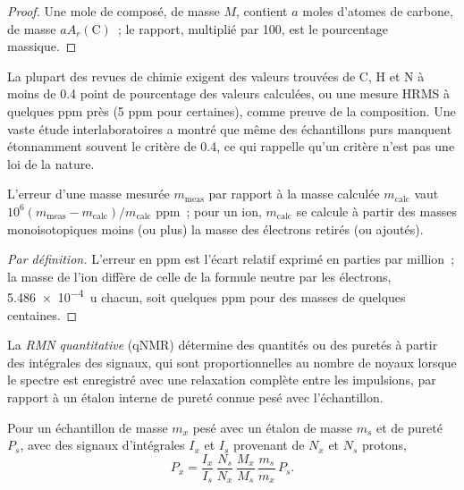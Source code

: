 \begin{proof}
Une mole de composé, de masse $M$, contient $a$ moles d'atomes de carbone, de masse $aA_r(\mathrm C)$~;
le rapport, multiplié par 100, est le pourcentage massique.
\end{proof}

La plupart des revues de chimie exigent des valeurs trouvées de C, H et N à
moins de 0.4 point de pourcentage des valeurs calculées, ou une mesure
HRMS à quelques ppm près (5 ppm pour certaines), comme preuve de la
composition. Une vaste étude interlaboratoires a montré que même des
échantillons purs manquent étonnamment souvent le critère de 0.4, ce qui
rappelle qu'un critère n'est pas une loi de la nature.

\begin{proposition}\label{prop:b3:lab-techniques-3:ppm-error}
L'erreur d'une masse mesurée $m_{\mathrm{meas}}$ par rapport à la masse calculée $m_{\mathrm{calc}}$ vaut
$10^6(m_{\mathrm{meas}} - m_{\mathrm{calc}})/m_{\mathrm{calc}}$ ppm~; pour un ion, $m_{\mathrm{calc}}$ se calcule à partir des masses monoisotopiques moins (ou plus) la
masse des électrons retirés (ou ajoutés).
\end{proposition}

\begin{proof}[Par définition]
L'erreur en ppm est l'écart relatif exprimé en parties par million~; la
masse de l'ion diffère de celle de la formule neutre par les électrons, \qty{5.486e-4}{u} chacun, soit
quelques ppm pour des masses de quelques centaines.
\end{proof}

\begin{definition}\label{def:b3:lab-techniques-3:qnmr}
La \emph{RMN quantitative} (qNMR) détermine des
quantités ou des puretés à partir des intégrales des signaux, qui sont
proportionnelles au nombre de noyaux lorsque le spectre est enregistré
avec une relaxation complète entre les impulsions, par rapport à un étalon
interne de pureté connue pesé avec l'échantillon.
\end{definition}

\begin{proposition}\label{prop:b3:lab-techniques-3:qnmr}
Pour un échantillon de masse $m_x$ pesé avec un étalon de masse $m_s$ et de pureté $P_s$, avec des signaux
d'intégrales $I_x$ et $I_s$ provenant de $N_x$ et $N_s$ protons,
\[
  P_x = \frac{I_x}{I_s}\,\frac{N_s}{N_x}\,\frac{M_x}{M_s}\,\frac{m_s}{m_x}\,P_s.
\]
\end{proposition}

